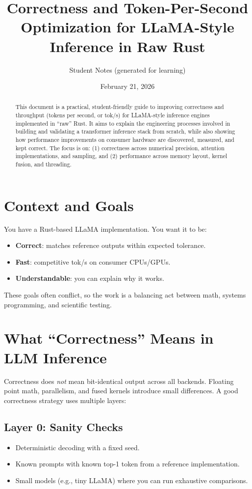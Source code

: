 \documentclass[11pt]{article}
\title{Correctness and Token-Per-Second Optimization for LLaMA-Style Inference in Raw Rust}
\author{Student Notes (generated for learning)}
\date{February 21, 2026}
\begin{document}
\maketitle

\begin{abstract}
This document is a practical, student-friendly guide to improving correctness and throughput (tokens per second, or tok/s) for LLaMA-style inference engines implemented in ``raw'' Rust. It aims to explain the engineering processes involved in building and validating a transformer inference stack from scratch, while also showing how performance improvements on consumer hardware are discovered, measured, and kept correct. The focus is on: (1) correctness across numerical precision, attention implementations, and sampling, and (2) performance across memory layout, kernel fusion, and threading.
\end{abstract}

\tableofcontents
\newpage

\section{Context and Goals}
You have a Rust-based LLaMA implementation. You want it to be:
\begin{itemize}
  \item \textbf{Correct}: matches reference outputs within expected tolerance.
  \item \textbf{Fast}: competitive tok/s on consumer CPUs/GPUs.
  \item \textbf{Understandable}: you can explain why it works.
\end{itemize}

These goals often conflict, so the work is a balancing act between math, systems programming, and scientific testing.

\section{What ``Correctness'' Means in LLM Inference}
Correctness does \emph{not} mean bit-identical output across all backends. Floating point math, parallelism, and fused kernels introduce small differences. A good correctness strategy uses multiple layers:

\subsection{Layer 0: Sanity Checks}
\begin{itemize}
  \item Deterministic decoding with a fixed seed.
  \item Known prompts with known top-1 token from a reference implementation.
  \item Small models (e.g., tiny LLaMA) where you can run exhaustive comparisons.
\end{itemize}
\end{document}
